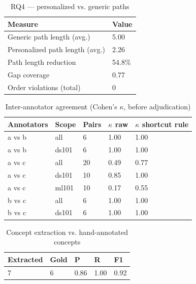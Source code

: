 \begin{table}[t]
\centering
\caption{RQ4 --- personalized vs. generic paths}
\label{tab:rq4}
\small
\begin{tabular}{ll}
\toprule
Measure & Value \\
\midrule
Generic path length (avg.) & 5.00 \\
Personalized path length (avg.) & 2.26 \\
Path length reduction & 54.8\% \\
Gap coverage & 0.77 \\
Order violations (total) & 0 \\
\bottomrule
\end{tabular}
\end{table}

\begin{table}[t]
\centering
\caption{Inter-annotator agreement (Cohen's $\kappa$, before adjudication)}
\label{tab:kappa}
\small
\begin{tabular}{lllll}
\toprule
Annotators & Scope & Pairs & $\kappa$ raw & $\kappa$ shortcut rule \\
\midrule
a vs b & all & 6 & 1.00 & 1.00 \\
a vs b & ds101 & 6 & 1.00 & 1.00 \\
a vs c & all & 20 & 0.49 & 0.77 \\
a vs c & ds101 & 10 & 0.85 & 1.00 \\
a vs c & ml101 & 10 & 0.17 & 0.55 \\
b vs c & all & 6 & 1.00 & 1.00 \\
b vs c & ds101 & 6 & 1.00 & 1.00 \\
\bottomrule
\end{tabular}
\end{table}

\begin{table}[t]
\centering
\caption{Concept extraction vs. hand-annotated concepts}
\label{tab:extraction}
\small
\begin{tabular}{lllll}
\toprule
Extracted & Gold & P & R & F1 \\
\midrule
7 & 6 & 0.86 & 1.00 & 0.92 \\
\bottomrule
\end{tabular}
\end{table}

